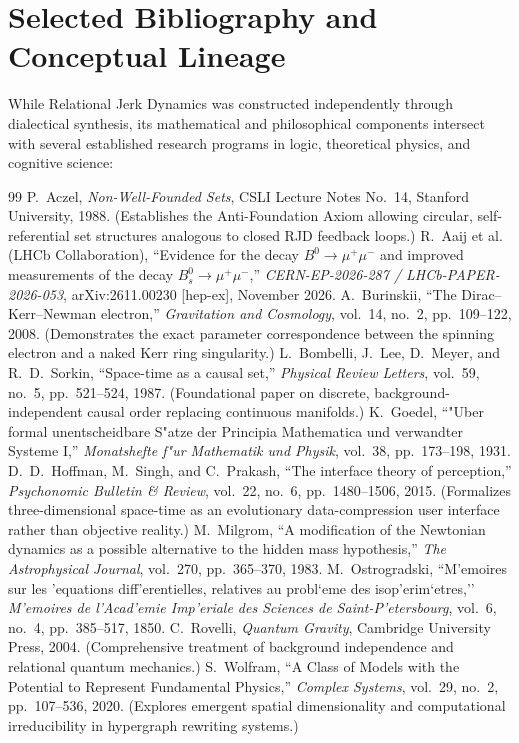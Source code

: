 \documentclass[11pt,a4paper]{article}
\theoremstyle{plain}
\theoremstyle{definition}
\theoremstyle{remark}
\begin{document}
\section{Selected Bibliography and Conceptual Lineage}
\label{app:bibliography}
While Relational Jerk Dynamics was constructed independently through dialectical synthesis, its mathematical and philosophical components intersect with several established research programs in logic, theoretical physics, and cognitive science:
\begin{thebibliography}{99}
P.~Aczel, \emph{Non-Well-Founded Sets}, CSLI Lecture Notes No.~14, Stanford University, 1988. (Establishes the Anti-Foundation Axiom allowing circular, self-referential set structures analogous to closed RJD feedback loops.)
R.~Aaij et al. (LHCb Collaboration), ``Evidence for the decay $B^0 \to \mu^+ \mu^-$ and improved measurements of the decay $B_s^0 \to \mu^+ \mu^-$,'' \emph{CERN-EP-2026-287 / LHCb-PAPER-2026-053}, arXiv:2611.00230 [hep-ex], November 2026.
A.~Burinskii, ``The Dirac--Kerr--Newman electron,'' \emph{Gravitation and Cosmology}, vol.~14, no.~2, pp.~109--122, 2008. (Demonstrates the exact parameter correspondence between the spinning electron and a naked Kerr ring singularity.)
L.~Bombelli, J.~Lee, D.~Meyer, and R.~D.~Sorkin, ``Space-time as a causal set,'' \emph{Physical Review Letters}, vol.~59, no.~5, pp.~521--524, 1987. (Foundational paper on discrete, background-independent causal order replacing continuous manifolds.)
K.~Goedel, ``"Uber formal unentscheidbare S"atze der Principia Mathematica und verwandter Systeme I,'' \emph{Monatshefte f"ur Mathematik und Physik}, vol.~38, pp.~173--198, 1931.
D.~D.~Hoffman, M.~Singh, and C.~Prakash, ``The interface theory of perception,'' \emph{Psychonomic Bulletin \& Review}, vol.~22, no.~6, pp.~1480--1506, 2015. (Formalizes three-dimensional space-time as an evolutionary data-compression user interface rather than objective reality.)
M.~Milgrom, ``A modification of the Newtonian dynamics as a possible alternative to the hidden mass hypothesis,'' \emph{The Astrophysical Journal}, vol.~270, pp.~365--370, 1983.
M.~Ostrogradski, ``M'emoires sur les 'equations diff'erentielles, relatives au probl`eme des isop'erim`etres,'' \emph{M'emoires de l'Acad'emie Imp'eriale des Sciences de Saint-P'etersbourg}, vol.~6, no.~4, pp.~385--517, 1850.
C.~Rovelli, \emph{Quantum Gravity}, Cambridge University Press, 2004. (Comprehensive treatment of background independence and relational quantum mechanics.)
S.~Wolfram, ``A Class of Models with the Potential to Represent Fundamental Physics,'' \emph{Complex Systems}, vol.~29, no.~2, pp.~107--536, 2020. (Explores emergent spatial dimensionality and computational irreducibility in hypergraph rewriting systems.)
\end{thebibliography}
\end{document}
